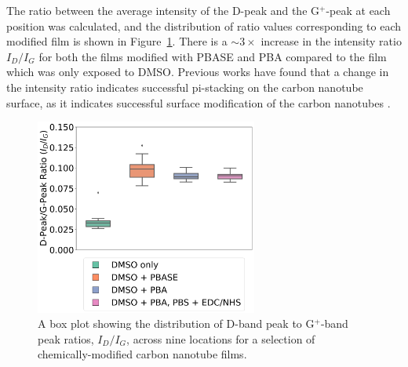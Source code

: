 \documentclass[
  a4paper,
]{scrbook}
\begin{document}
The ratio between the average intensity of the D-peak and the
G\(^+\)-peak at each position was calculated, and the distribution of
ratio values corresponding to each modified film is shown in
Figure~\ref{fig-linker-raman}. There is a \(\sim 3 \times\) increase in
the intensity ratio \(I_D/I_G\) for both the films modified with PBASE
and PBA compared to the film which was only exposed to DMSO. Previous
works have found that a change in the intensity ratio indicates
successful pi-stacking on the carbon nanotube surface, as it indicates
successful surface modification of the carbon nanotubes
\autocite{Wei2010,Lan2013}.

\begin{figure}

{\centering \includegraphics[width=0.65\textwidth,height=\textheight]{figures/ch6/comparison_raman.png}

}

\caption[A box plot showing the distribution of D-band peak to
G\(^+\)-band peak ratios, \(I_D/I_G\), across nine locations for a
selection of chemically-modified carbon nanotube
films.]{\label{fig-linker-raman}A box plot showing the distribution of
D-band peak to G\(^+\)-band peak ratios, \(I_D/I_G\), across nine
locations for a selection of chemically-modified carbon nanotube films.}

\end{figure}
\end{document}
